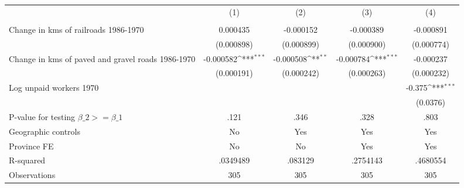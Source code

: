 {
\def\sym#1{\ifmmode^{#1}\else\(^{#1}\)\fi}
\begin{tabular}{l*{4}{c}}
\hline\hline
                &\multicolumn{1}{c}{(1)}&\multicolumn{1}{c}{(2)}&\multicolumn{1}{c}{(3)}&\multicolumn{1}{c}{(4)}\\
                &\multicolumn{1}{c}{}&\multicolumn{1}{c}{}&\multicolumn{1}{c}{}&\multicolumn{1}{c}{}\\
\hline
Change in kms of railroads 1986-1970& 0.000435         &-0.000152         &-0.000389         &-0.000891         \\
                &(0.000898)         &(0.000899)         &(0.000900)         &(0.000774)         \\
[1em]
Change in kms of paved and gravel roads 1986-1970&-0.000582\sym{***}&-0.000508\sym{**} &-0.000784\sym{***}&-0.000237         \\
                &(0.000191)         &(0.000242)         &(0.000263)         &(0.000232)         \\
[1em]
Log unpaid workers 1970&                  &                  &                  &   -0.375\sym{***}\\
                &                  &                  &                  & (0.0376)         \\
\hline
P-value for testing $\beta\_{2} >= \beta\_{1}$&     .121         &     .346         &     .328         &     .803         \\
Geographic controls&       No         &      Yes         &      Yes         &      Yes         \\
Province FE     &       No         &       No         &      Yes         &      Yes         \\
R-squared       & .0349489         &  .083129         & .2754143         & .4680554         \\
Observations    &      305         &      305         &      305         &      305         \\
\hline\hline
\end{tabular}
}
